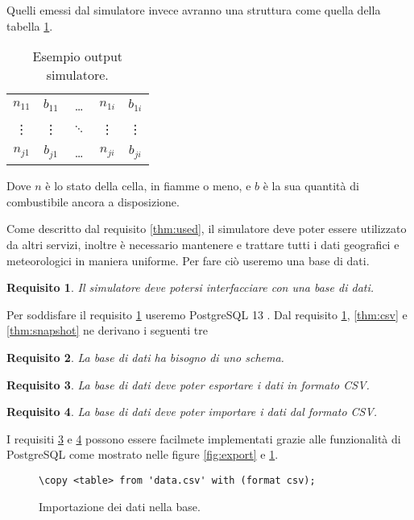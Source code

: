 \documentclass[draft]{article}
\newcommand{\eng}[1]{\foreignlanguage{english}{#1}} %
\newtheorem{requirement}{Requisito}
\begin{document}
Quelli emessi dal simulatore invece avranno una struttura come quella della
tabella \ref{tab:output}.

\begin{table}
\centering
\begin{tabular}{|c|c|c|c|c|}
	\hline
	$n_{11}$ & $b_{11}$ & \dots & $n_{1i}$ & $b_{1i}$\\
	\vdots & \vdots & $\ddots$ & \vdots & \vdots\\
	$n_{j1}$ & $b_{j1}$ & \dots & $n_{ji}$ & $b_{ji}$\\
	\hline
\end{tabular}
\caption{Esempio \eng{output} simulatore.}
\label{tab:output}
\end{table}

Dove $n$ è lo stato della cella, in fiamme o meno, e $b$ è la sua quantità di
combustibile ancora a disposizione.
\fi

Come descritto dal requisito \ref{thm:used}, il simulatore deve poter essere
utilizzato da altri servizi, inoltre è necessario mantenere e trattare tutti i
dati geografici e meteorologici in maniera uniforme. Per fare ciò useremo una
base di dati.

\begin{requirement}\label{thm:db}
Il simulatore deve potersi interfacciare con una base di dati.
\end{requirement}

Per soddisfare il requisito \ref{thm:db} useremo PostgreSQL 13 \cite{psql}. Dal
requisito \ref{thm:db}, \ref{thm:csv} e \ref{thm:snapshot} ne derivano i
seguenti tre

\begin{requirement}
La base di dati ha bisogno di uno schema.
\end{requirement}

\begin{requirement}\label{thm:export}
La base di dati deve poter esportare i dati in formato CSV.
\end{requirement}

\begin{requirement}\label{thm:import}
La base di dati deve poter importare i dati dal formato CSV.
\end{requirement}

I requisiti \ref{thm:export} e \ref{thm:import} possono essere facilmete
implementati grazie alle funzionalità di PostgreSQL come mostrato nelle figure
\ref{fig:export} e \ref{fig:import}.

\begin{figure}
\centering\verb+\copy <table> from 'data.csv' with (format csv);+
\caption{Importazione dei dati nella base.}
\label{fig:import}
\end{figure}
\end{document}
